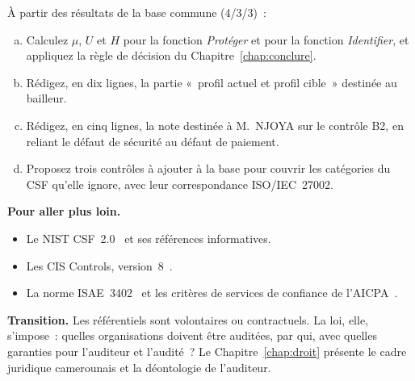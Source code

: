 \begin{boxexo}[title={\ding{45}\quad Exercice~9.4. Trois rapports pour l'ANPP \niveauexpert}]
À partir des résultats de la base commune (4/3/3)~:
\begin{enumerate}[(a)]
    \item Calculez $\mu$, $U$ et $H$ pour la fonction \emph{Protéger} et
          pour la fonction \emph{Identifier}, et appliquez la règle de
          décision du Chapitre~\ref{chap:conclure}.
    \item Rédigez, en dix lignes, la partie «~profil actuel et profil
          cible~» destinée au bailleur.
    \item Rédigez, en cinq lignes, la note destinée à M.~NJOYA sur le
          contrôle B2, en reliant le défaut de sécurité au défaut de
          paiement.
    \item Proposez trois contrôles à ajouter à la base pour couvrir les
          catégories du CSF qu'elle ignore, avec leur correspondance
          ISO/IEC~27002.
\end{enumerate}
\end{boxexo}

\bigskip

\begin{boxinfo}
\textbf{Pour aller plus loin.}
\begin{itemize}
    \item Le NIST CSF~2.0~\cite{nist2024csf} et ses références informatives.
    \item Les CIS Controls, version~8~\cite{cis2021controls}.
    \item La norme ISAE~3402~\cite{iaasb2011isae3402} et les critères de
          services de confiance de l'AICPA~\cite{aicpa2017tsc}.
\end{itemize}
\end{boxinfo}

\begin{boxinfo}
\textbf{Transition.} Les référentiels sont volontaires ou contractuels. La
loi, elle, s'impose~: quelles organisations doivent être auditées, par
qui, avec quelles garanties pour l'auditeur et l'audité~? Le
Chapitre~\ref{chap:droit} présente le cadre juridique camerounais et la
déontologie de l'auditeur.
\end{boxinfo}
